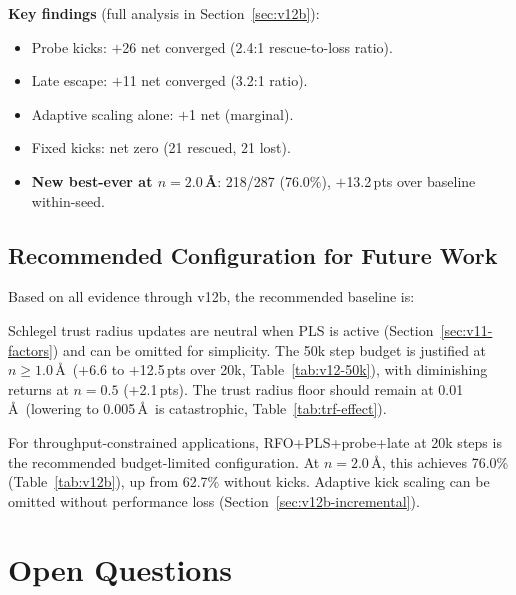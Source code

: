 \documentclass[11pt,a4paper]{article}
\theoremstyle{definition}
\begin{document}
\textbf{Key findings} (full analysis in Section~\ref{sec:v12b}):
\begin{itemize}[nosep]
  \item Probe kicks: $+$26 net converged (2.4:1 rescue-to-loss ratio).
  \item Late escape: $+$11 net converged (3.2:1 ratio).
  \item Adaptive scaling alone: $+$1 net (marginal).
  \item Fixed kicks: net zero (21 rescued, 21 lost).
  \item \textbf{New best-ever at $n=2.0$\,\AA}: 218/287 (76.0\%),
    $+$13.2\,pts over baseline within-seed.
\end{itemize}

\subsection{Recommended Configuration for Future Work}

Based on all evidence through v12b, the recommended baseline is:
\begin{center}
\end{center}
Schlegel trust radius updates are neutral when PLS is active
(Section~\ref{sec:v11-factors}) and can be omitted for simplicity.
The 50k step budget is justified at $n \geq 1.0$\,\AA\ ($+$6.6 to
$+$12.5\,pts over 20k, Table~\ref{tab:v12-50k}), with diminishing
returns at $n=0.5$ ($+$2.1\,pts).  The trust radius floor should remain
at 0.01\,\AA\ (lowering to 0.005\,\AA\ is catastrophic,
Table~\ref{tab:trf-effect}).

For throughput-constrained applications, RFO+PLS+probe+late at 20k steps
is the recommended budget-limited configuration.  At $n=2.0$\,\AA, this
achieves 76.0\% (Table~\ref{tab:v12b}), up from 62.7\% without kicks.
Adaptive kick scaling can be omitted without performance loss
(Section~\ref{sec:v12b-incremental}).

\section{Open Questions}
\label{sec:open}
\end{document}
